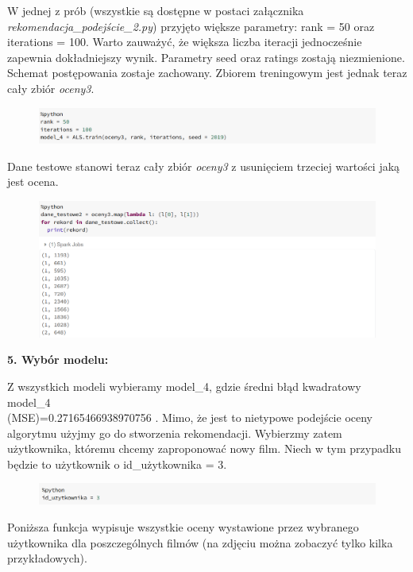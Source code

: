 \documentclass[12pt,a4paper]{report}
\begin{document}
W jednej z prób (wszystkie są dostępne w postaci załącznika \textit{rekomendacja\_podejście\_2.py}) przyjęto większe parametry: rank = 50 oraz iterations = 100. Warto zauważyć, że większa liczba iteracji jednocześnie zapewnia dokładniejszy wynik. Parametry seed oraz ratings zostają niezmienione. Schemat postępowania zostaje zachowany. Zbiorem treningowym jest jednak teraz cały zbiór \textit{oceny3}.

\begin{figure}[H]
\includegraphics[scale=0.5]{obrazy/ALS13.PNG} 
\end{figure}

Dane testowe stanowi teraz cały zbiór \textit{oceny3} z usunięciem trzeciej wartości jaką jest ocena.

\begin{figure}[H]
\includegraphics[scale=0.5]{obrazy/ALS14.PNG} 
\end{figure}

\textbf{5. Wybór modelu:}

Z wszystkich modeli wybieramy model\_4, gdzie średni błąd kwadratowy model\_4 
\\(MSE)=0.27165466938970756 . Mimo, że jest to nietypowe podejście oceny algorytmu użyjmy go do stworzenia rekomendacji. Wybierzmy zatem użytkownika, któremu chcemy zaproponować nowy film. Niech w tym przypadku będzie to użytkownik o id\_użytkownika = 3.

\begin{figure}[H]
\includegraphics[scale=0.5]{obrazy/ALS15.PNG} 
\end{figure}

Poniższa funkcja wypisuje wszystkie oceny wystawione przez wybranego użytkownika dla poszczególnych filmów (na zdjęciu można zobaczyć tylko kilka przykładowych).
\end{document}
